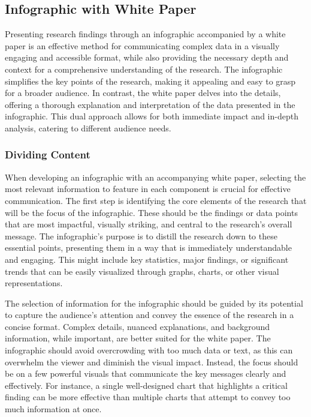\documentclass[
]{book}
\begin{document}
\subsection{Infographic with White Paper}\label{infographic-with-white-paper}

Presenting research findings through an infographic accompanied by a white paper is an effective method for communicating complex data in a visually engaging and accessible format, while also providing the necessary depth and context for a comprehensive understanding of the research. The infographic simplifies the key points of the research, making it appealing and easy to grasp for a broader audience. In contrast, the white paper delves into the details, offering a thorough explanation and interpretation of the data presented in the infographic. This dual approach allows for both immediate impact and in-depth analysis, catering to different audience needs.

\subsubsection*{Dividing Content}\label{dividing-content}

When developing an infographic with an accompanying white paper, selecting the most relevant information to feature in each component is crucial for effective communication. The first step is identifying the core elements of the research that will be the focus of the infographic. These should be the findings or data points that are most impactful, visually striking, and central to the research's overall message. The infographic's purpose is to distill the research down to these essential points, presenting them in a way that is immediately understandable and engaging. This might include key statistics, major findings, or significant trends that can be easily visualized through graphs, charts, or other visual representations.

The selection of information for the infographic should be guided by its potential to capture the audience's attention and convey the essence of the research in a concise format. Complex details, nuanced explanations, and background information, while important, are better suited for the white paper. The infographic should avoid overcrowding with too much data or text, as this can overwhelm the viewer and diminish the visual impact. Instead, the focus should be on a few powerful visuals that communicate the key messages clearly and effectively. For instance, a single well-designed chart that highlights a critical finding can be more effective than multiple charts that attempt to convey too much information at once.
\end{document}
